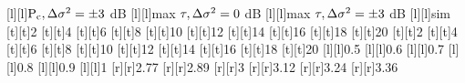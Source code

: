 [l][l]{\fontsize{9}{13.5}\selectfont \color[rgb]{0,0,0}$\text{P}_{\text{c}}, \Delta\sigma^2 = \pm 3$ dB}%
[l][l]{\fontsize{9}{13.5}\selectfont \color[rgb]{0,0,0}max $\tau, \Delta\sigma^2 = 0$ dB}%
[l][l]{\fontsize{9}{13.5}\selectfont \color[rgb]{0,0,0}max $\tau, \Delta\sigma^2 = \pm 3$ dB}%
[l][l]{\fontsize{9}{13.5}\selectfont \color[rgb]{0,0,0}sim}%
%
\fontsize{9}{13.5}%
\selectfont%
%
[t][t]{2}%
[t][t]{4}%
[t][t]{6}%
[t][t]{8}%
[t][t]{10}%
[t][t]{12}%
[t][t]{14}%
[t][t]{16}%
[t][t]{18}%
[t][t]{20}%
[t][t]{2}%
[t][t]{4}%
[t][t]{6}%
[t][t]{8}%
[t][t]{10}%
[t][t]{12}%
[t][t]{14}%
[t][t]{16}%
[t][t]{18}%
[t][t]{20}%
%
[l][l]{0.5}%
[l][l]{0.6}%
[l][l]{0.7}%
[l][l]{0.8}%
[l][l]{0.9}%
[l][l]{1}%
[r][r]{2.77}%
[r][r]{2.89}%
[r][r]{3}%
[r][r]{3.12}%
[r][r]{3.24}%
[r][r]{3.36}%
%
%
